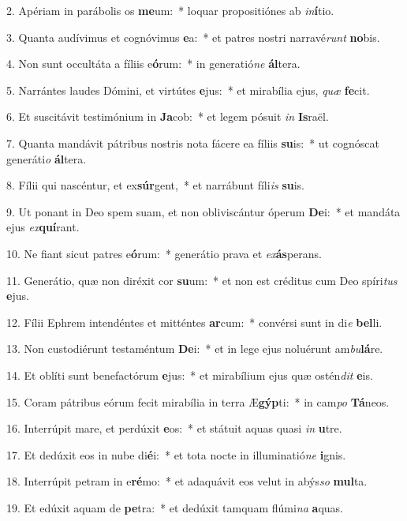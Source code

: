 2. Apériam in parábolis os \textbf{me}um:~*  loquar propositiónes ab \textit{in}\textbf{í}tio.\

3. Quanta audívimus et cognóvimus \textbf{e}a:~*  et patres nostri narravé\textit{runt} \textbf{no}bis.\

4. Non sunt occultáta a fíliis e\textbf{ó}rum:~*  in generatió\textit{ne} \textbf{ál}tera.\

5. Narrántes laudes Dómini, et virtútes \textbf{e}jus:~*  et mirabília ejus, \textit{quæ} \textbf{fe}cit.\

6. Et suscitávit testimónium in \textbf{Ja}cob:~*  et legem pósuit \textit{in} \textbf{Is}raël.\

7. Quanta mandávit pátribus nostris nota fácere ea fíliis \textbf{su}is:~*  ut cognóscat generáti\textit{o} \textbf{ál}tera.\

8. Fílii qui nascéntur, et ex\textbf{súr}gent,~*  et narrábunt fíli\textit{is} \textbf{su}is.\

9. Ut ponant in Deo spem suam, et non obliviscántur óperum \textbf{De}i:~*  et mandáta ejus \textit{ex}\textbf{quí}rant.\

10. Ne fiant sicut patres e\textbf{ó}rum:~*  generátio prava et \textit{ex}\textbf{ás}perans.\

11. Generátio, quæ non diréxit cor \textbf{su}um:~*  et non est créditus cum Deo spíri\textit{tus} \textbf{e}jus.\

12. Fílii Ephrem intendéntes et mitténtes \textbf{ar}cum:~*  convérsi sunt in di\textit{e} \textbf{bel}li.\

13. Non custodiérunt testaméntum \textbf{De}i:~*  et in lege ejus noluérunt am\textit{bu}\textbf{lá}re.\

14. Et oblíti sunt benefactórum \textbf{e}jus:~*  et mirabílium ejus quæ ostén\textit{dit} \textbf{e}is.\

15. Coram pátribus eórum fecit mirabília in terra Æ\textbf{gýp}ti:~*  in cam\textit{po} \textbf{Tá}neos.\

16. Interrúpit mare, et perdúxit \textbf{e}os:~*  et státuit aquas quasi \textit{in} \textbf{u}tre.\

17. Et dedúxit eos in nube di\textbf{é}i:~*  et tota nocte in illuminatió\textit{ne} \textbf{i}gnis.\

18. Interrúpit petram in e\textbf{ré}mo:~*  et adaquávit eos velut in abýs\textit{so} \textbf{mul}ta.\

19. Et edúxit aquam de \textbf{pe}tra:~*  et dedúxit tamquam flúmi\textit{na} \textbf{a}quas.\

